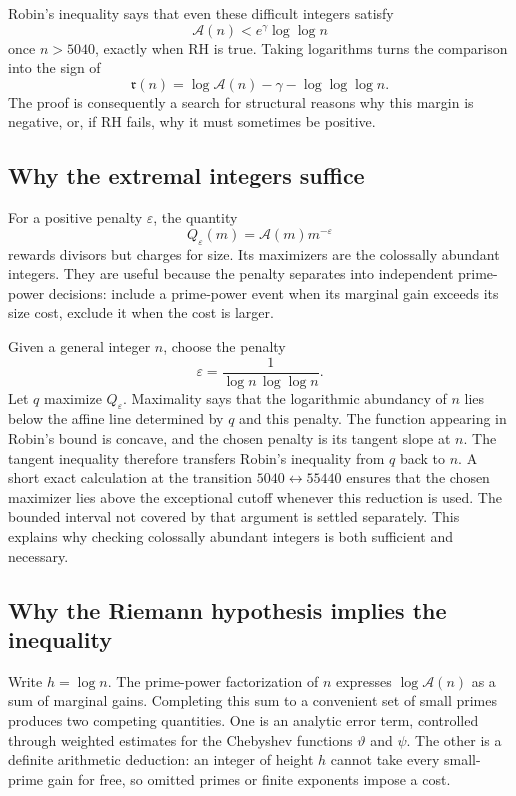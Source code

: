 \documentclass[11pt]{amsart}
\theoremstyle{definition}
\theoremstyle{remark}
\numberwithin{equation}{section}
\newcommand{\RH}{\mathrm{RH}}
\newcommand{\euler}{\gamma}
\newcommand{\A}{\mathcal{A}}
\newcommand{\M}{\mathfrak r}
\newcommand{\eps}{\varepsilon}
\begin{document}
Robin's inequality says that even these difficult integers satisfy
\[
 \A(n)<e^\euler\log\log n
\]
once $n>5040$, exactly when $\RH$ is true.  Taking logarithms turns the
comparison into the sign of
\[
 \M(n)=\log\A(n)-\euler-\log\log\log n.
\]
The proof is consequently a search for structural reasons why this margin is
negative, or, if $\RH$ fails, why it must sometimes be positive.

\subsection{Why the extremal integers suffice}

For a positive penalty $\eps$, the quantity
\[
 Q_\eps(m)=\A(m)m^{-\eps}
\]
rewards divisors but charges for size.  Its maximizers are the colossally
abundant integers.  They are useful because the penalty separates into
independent prime-power decisions: include a prime-power event when its
marginal gain exceeds its size cost, exclude it when the cost is larger.

Given a general integer $n$, choose the penalty
\[
 \eps=\frac{1}{\log n\,\log\log n}.
\]
Let $q$ maximize $Q_\eps$.  Maximality says that the logarithmic abundancy of
$n$ lies below the affine line determined by $q$ and this penalty.  The
function appearing in Robin's bound is concave, and the chosen penalty is its
tangent slope at $n$.  The tangent inequality therefore transfers Robin's
inequality from $q$ back to $n$.  A short exact calculation at the transition
$5040\leftrightarrow55440$ ensures that the chosen maximizer lies above the
exceptional cutoff whenever this reduction is used.  The bounded interval
not covered by that argument is settled separately.  This explains why
checking colossally abundant integers is both sufficient and necessary.

\subsection{Why the Riemann hypothesis implies the inequality}

Write $h=\log n$.  The prime-power factorization of $n$ expresses
$\log\A(n)$ as a sum of marginal gains.  Completing this sum to a convenient
set of small primes produces two competing quantities.  One is an analytic
error term, controlled through weighted estimates for the Chebyshev
functions $\vartheta$ and $\psi$.  The other is a definite arithmetic
deduction: an integer of height $h$ cannot take every small-prime gain for
free, so omitted primes or finite exponents impose a cost.
\end{document}
